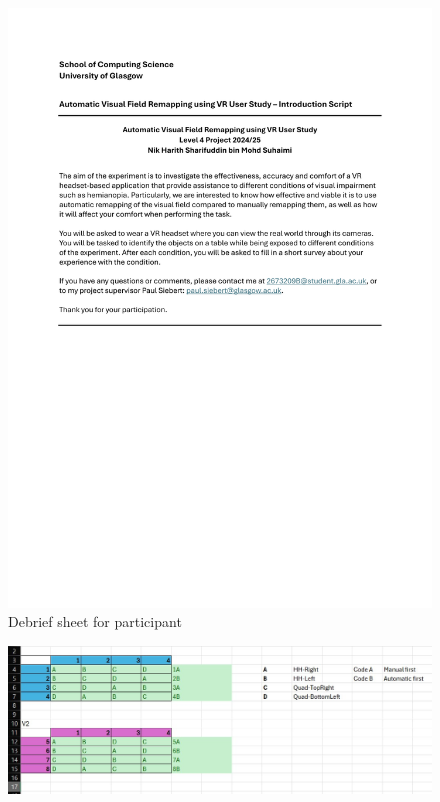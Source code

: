 \documentclass{l4proj}
\begin{document}
\begin{appendices}
\begin{figure}[htbp]
    \centering
    \includegraphics[width=1\linewidth]{appendix/Debrief sheet.pdf}    
    \caption{Debrief sheet for participant}
    \label{appx:debrief}
\end{figure}
\newpage

\begin{figure}[htbp]
    \centering
    \includegraphics[width=1\linewidth]{appendix/LatinSquares.jpg}    


\end{figure}
\end{appendices}
\end{document}
